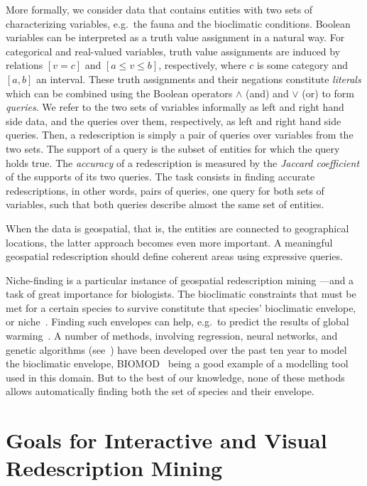 \documentclass{llncs}
\begin{document}
More formally, we consider data that contains entities with two sets
of characterizing variables, e.g.\ the fauna and the bioclimatic
conditions. 
Boolean variables can be interpreted as a truth value
assignment in a natural way.  For categorical and real-valued
variables, truth value assignments are induced by relations $[v=c]$
and $[a \leq v \leq b]$, respectively, where $c$ is some category and
$[a, b]$ an interval.  These truth assignments and their negations
constitute \emph{literals} which can be combined using the Boolean
operators $\land$ (and) and $\lor$ (or) to form \emph{queries}.
We refer to the two sets of variables informally as left and right
hand side data, and the queries over them, respectively, as left and
right hand side queries.
Then, a redescription is simply a pair of queries over variables from the
two sets.  The support of a query is the subset of entities for which
the query holds true.  The \emph{accuracy} of a redescription is
measured by the \emph{Jaccard coefficient} of the supports of its two
queries.
The task consists in finding accurate redescriptions, in other words, pairs of
queries, one query for both sets of variables, such that both queries
describe almost the same set of entities.

When the data is geospatial, that is, the entities are connected to
geographical locations, the latter approach becomes even more
important. A meaningful geospatial redescription should define
coherent areas using expressive queries.

Niche-finding is a particular instance of geospatial redescription
mining ---and a task of great importance for biologists.  The
bioclimatic constraints that must be met for a certain species to
survive constitute that species' bioclimatic envelope, or
niche~\cite{grinnell17niche}.  Finding such envelopes can help, e.g.\
to predict the results of global warming~\cite{pearson03predicting}.
A number of methods, involving regression, neural networks, and
genetic algorithms (see~\cite{soberon05interpretation}) have been
developed over the past ten year to model the bioclimatic envelope,
\textsc{BIOMOD}~\cite{thuiller09biomod} being a good example of a
modelling tool used in this domain.  But to the best of our knowledge,
none of these methods allows automatically finding both the set of
species and their envelope.

\section{Goals for Interactive and Visual Redescription Mining}
\label{sec:goals-inter-visu}
\end{document}
